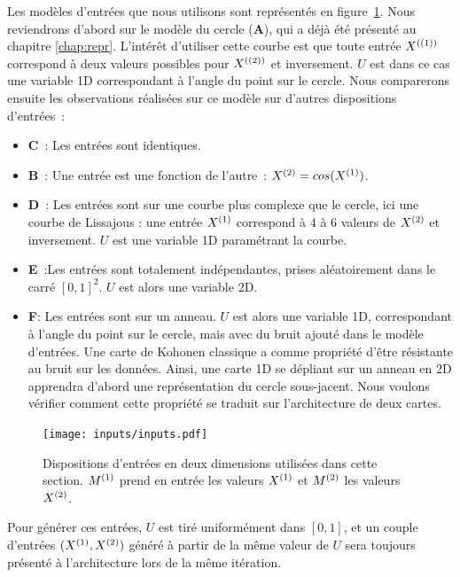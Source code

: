 \documentclass[../main]{subfiles}
\begin{document}
Les modèles d'entrées que nous utilisons sont représentés en figure~\ref{fig:input_list}.
Nous reviendrons d'abord sur le modèle du cercle (\textbf{A}), qui a déjà été présenté au chapitre \ref{chap:repr}. L'intérêt d'utiliser cette courbe est que toute entrée $X^{({(1)})}$ correspond à deux valeurs possibles pour $X^{({(2)})}$ et inversement. $U$ est dans ce cas une variable 1D correspondant à l'angle du point sur le cercle.
Nous comparerons ensuite les observations réalisées sur ce modèle sur d'autres dispositions d'entrées~:
\begin{itemize}
	\item \textbf{C}~: Les entrées sont identiques.
	\item \textbf{B}~: Une entrée est une fonction de l'autre~: $X^{({2})} = cos(X^{({1})})$.
	\item \textbf{D}~: Les entrées sont sur une courbe plus complexe que le cercle, ici une courbe de Lissajous : une entrée $X^{({1})}$ correspond à 4 à 6 valeurs de $X^{({2})}$ et inversement. $U$ est une variable 1D paramétrant la courbe.
	\item \textbf{E}~:Les entrées sont totalement indépendantes, prises aléatoirement dans le carré $[0,1]^2$. $U$ est alors une variable 2D.
	\item \textbf{F}: Les entrées sont sur un anneau. $U$ est alors une variable 1D, correspondant à l'angle du point sur le cercle, mais avec du bruit ajouté dans le modèle d'entrées. 
	Une carte de Kohonen classique a comme propriété d'être résistante au bruit sur les données. Ainsi, une carte 1D se dépliant sur un anneau en 2D apprendra d'abord une représentation du cercle sous-jacent. Nous voulons vérifier comment cette propriété se traduit sur l'architecture de deux cartes.
\end{itemize}

\begin{figure}[h!]
	\texttt{[image: inputs/inputs.pdf]}
	\caption{Dispositions d'entrées en deux dimensions utilisées dans cette section. $M^{({1})}$ prend en entrée les valeurs $X^{({1})}$ et $M^{({2})}$ les valeurs $X^{({2})}$. \label{fig:input_list}}
\end{figure}

Pour générer ces entrées, $U$ est tiré uniformément dans $[0,1]$, et un couple d'entrées $(X^{({1})},X^{({2})})$ généré à partir de la même valeur de $U$ sera toujours présenté à l'architecture lors de la même itération.
\end{document}
